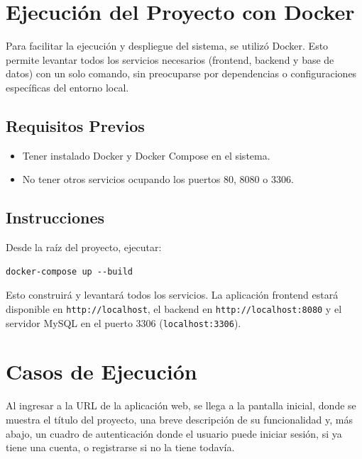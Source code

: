 \section{Ejecución del Proyecto con Docker}

Para facilitar la ejecución y despliegue del sistema, se utilizó Docker. Esto permite levantar todos los servicios necesarios (frontend, backend y base de datos) con un solo comando, sin preocuparse por dependencias o configuraciones específicas del entorno local.

\subsection{Requisitos Previos}

\begin{itemize}
    \item Tener instalado Docker y Docker Compose en el sistema.
    \item No tener otros servicios ocupando los puertos 80, 8080 o 3306.
\end{itemize}

\subsection{Instrucciones}

Desde la raíz del proyecto, ejecutar:

\begin{lstlisting}[style=terminal]
docker-compose up --build
\end{lstlisting}

Esto construirá y levantará todos los servicios. La aplicación frontend estará disponible en \texttt{http://localhost}, el backend en \texttt{http://localhost:8080} y el servidor MySQL en el puerto 3306 (\texttt{localhost:3306}).

\section{Casos de Ejecución}

Al ingresar a la URL de la aplicación web, se llega a la pantalla inicial, donde se muestra el título del proyecto, una breve descripción de su funcionalidad y, más abajo, un cuadro de autenticación donde el usuario puede iniciar sesión, si ya tiene una cuenta, o registrarse si no la tiene todavía.

